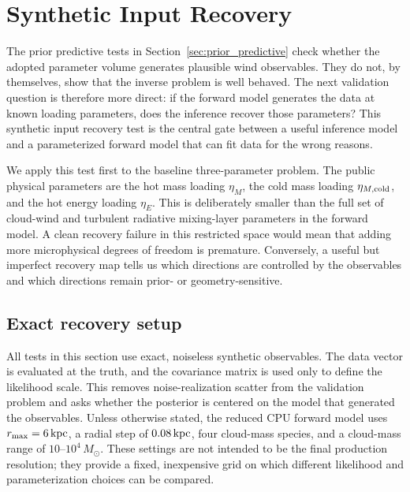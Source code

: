 \section{Synthetic Input Recovery}
\label{sec:synthetic_recovery}

The prior predictive tests in Section~\ref{sec:prior_predictive} check whether
the adopted parameter volume generates plausible wind observables.  They do not,
by themselves, show that the inverse problem is well behaved.  The next
validation question is therefore more direct: if the forward model generates the
data at known loading parameters, does the inference recover those parameters?
This synthetic input recovery test is the central gate between a useful
inference model and a parameterized forward model that can fit data for the
wrong reasons.

We apply this test first to the baseline three-parameter problem.  The public
physical parameters are the hot mass loading $\eta_M$, the cold mass loading
$\eta_{M,\rm cold}$, and the hot energy loading $\eta_E$.  This is deliberately
smaller than the full set of cloud-wind and turbulent radiative mixing-layer
parameters in the forward model.  A clean recovery failure in this restricted
space would mean that adding more microphysical degrees of freedom is premature.
Conversely, a useful but imperfect recovery map tells us which directions are
controlled by the observables and which directions remain prior- or
geometry-sensitive.

\subsection{Exact recovery setup}
\label{subsec:synthetic_recovery_setup}

All tests in this section use exact, noiseless synthetic observables.  The data
vector is evaluated at the truth, and the covariance matrix is used only to
define the likelihood scale.  This removes noise-realization scatter from the
validation problem and asks whether the posterior is centered on the model that
generated the observables.  Unless otherwise stated, the reduced CPU forward
model uses $r_{\rm max}=6\,{\rm kpc}$, a radial step of $0.08\,{\rm kpc}$, four
cloud-mass species, and a cloud-mass range of $10$--$10^4\,M_\odot$.  These
settings are not intended to be the final production resolution; they provide a
fixed, inexpensive grid on which different likelihood and parameterization
choices can be compared.

